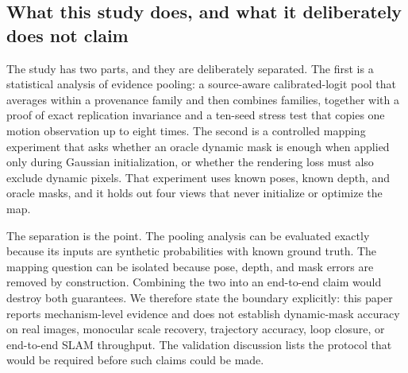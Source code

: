 \documentclass[10pt,conference]{IEEEtran}
\begin{document}
\subsection{What this study does, and what it deliberately does not claim}
The study has two parts, and they are deliberately separated. The first is a statistical analysis of evidence pooling: a source-aware calibrated-logit pool that averages within a provenance family and then combines families, together with a proof of exact replication invariance and a ten-seed stress test that copies one motion observation up to eight times. The second is a controlled mapping experiment that asks whether an oracle dynamic mask is enough when applied only during Gaussian initialization, or whether the rendering loss must also exclude dynamic pixels. That experiment uses known poses, known depth, and oracle masks, and it holds out four views that never initialize or optimize the map.

The separation is the point. The pooling analysis can be evaluated exactly because its inputs are synthetic probabilities with known ground truth. The mapping question can be isolated because pose, depth, and mask errors are removed by construction. Combining the two into an end-to-end claim would destroy both guarantees. We therefore state the boundary explicitly: this paper reports mechanism-level evidence and does not establish dynamic-mask accuracy on real images, monocular scale recovery, trajectory accuracy, loop closure, or end-to-end SLAM throughput. The validation discussion lists the protocol that would be required before such claims could be made.
\end{document}
